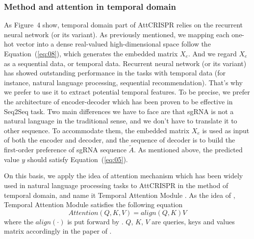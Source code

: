 \documentclass{bioinfo}
\begin{document}
\subsubsection{Method and attention in temporal domain}
As Figure~4\vphantom{\ref{fig:04}} show, temporal domain part of AttCRISPR relies on the recurrent neural network (or its variant). 
As previously mentioned, we mapping each one-hot vector into a dense real-valued high-dimensional space follow the Equation~(\ref{eq:08}), which generates the embedded matrix $X_e$.
And we regard $X_{e}$ as a sequential data, or temporal data.
Recurrent neural network (or its variant) has showed outstanding performance in the tasks with temporal data (for instance, natural language processing, sequential recommendation). 
That's why we prefer to use it to extract potential temporal features. 
To be precise, we prefer the architecture of encoder-decoder which has been proven to be effective in Seq2Seq task. 
Two main differences we have to face are that sgRNA is not a natural language in the traditional sense, and we don't have to translate it to other sequence. 
To accommodate them, the embedded matrix $X_e$ is used as input of both the encoder and decoder, and the sequence of decoder is to build the first-order preference of sgRNA sequence $\tilde{A}$. 
As mentioned above, the predicted value $y$ should satisfy Equation~(\ref{eq:05}). 

On this basis, we apply the idea of attention mechanism which has been widely used in natural language processing tasks to AttCRISPR in the method of temporal domain, 
and name it Temporal Attention Module \citep{vaswani2017attention,luong2015effective,bahdanau2014neural}.
As the idea of \citeauthor{vaswani2017attention}, Temporal Attention Module satisfies the following equation
\begin{equation}
Attention(Q,K,V)=align(Q,K)V\label{eq:13}
\end{equation}
where the $align(\cdot)$ is put forward by \citeauthor{luong2015effective}. 
$Q$, $K$, $V$ are queries, keys and values matrix accordingly in the paper of \citeauthor{vaswani2017attention}. 
\end{document}
